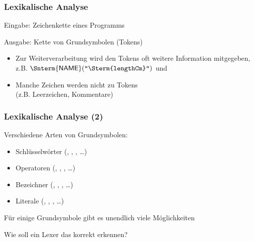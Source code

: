 \documentclass[aspectratio=1610,onlymath]{beamer}
\begin{document}
\begin{frame}\frametitle{Lexikalische Analyse}

\alert{Eingabe:} Zeichenkette eines Programms\\[1ex]

\alert{Ausgabe:} Kette von Grundsymbolen (Tokens)\\[1ex]

\begin{itemize}
\item Zur Weiterverarbeitung wird den Tokens oft weitere Information mitgegeben,\\
	z.B. $\textsf{\Snterm{NAME}} (\texttt{"{}\Sterm{lengthCm}"{}})$ und 
\item Manche Zeichen werden nicht zu Tokens\\(z.B. Leerzeichen, Kommentare)
\end{itemize}

\end{frame}

\begin{frame}\frametitle{Lexikalische Analyse (2)}

Verschiedene Arten von Grundsymbolen:
\begin{itemize}
\item Schlüsselwörter (\texttt{}, \texttt{}, \texttt{}, \ldots)
\item Operatoren (\texttt{\Sterm{=}}, \texttt{\Sterm{+}}, \texttt{\Sterm{{>}{}{>}}}, \ldots)
\item Bezeichner (\texttt{}, \texttt{}, \texttt{}, \ldots)
\item Literale (\texttt{}, \texttt{}, \texttt{}, \ldots)
\end{itemize}
\medskip

Für einige Grundsymbole gibt es unendlich viele Möglichkeiten

Wie soll ein Lexer das korrekt erkennen?

\end{frame}
\end{document}
